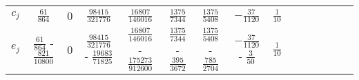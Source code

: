 \begin{table*}[htb]
\begin{tabular}{c|cccccccccccccc}
    $c_j$ &$\frac{61}{864}$ &
    0 &
    $\frac{98415}{321776}$ &
    $\frac{16807}{146016}$ &
    $\frac{1375}{7344}$ &
    $\frac{1375}{5408}$ &
    $-\frac{37}{1120}$ &
    $\frac{1}{10}$ &  \vspace{.1in} \\
    $e_j$ & $\frac{61}{864}$   - $\frac{821}{10800}$ &
    0 &
    $\frac{98415}{321776}$   - $\frac{19683}{71825}$ &
    $\frac{16807}{146016}$  - $\frac{175273}{912600}$ &
    $\frac{1375}{7344}$   - $\frac{395}{3672}$ &
    $\frac{1375}{5408}$   - $\frac{785}{2704}$ &
    $-\frac{37}{1120}$   - $\frac{3}{50}$ &
    $\frac{1}{10}$ &  \vspace{.1in} \\
  \hline\hline
\end{tabular}
\label{Table:PD56Coefficients}
\end{table*}
